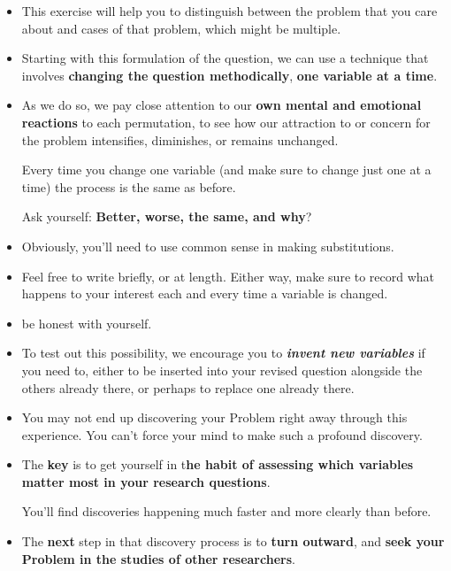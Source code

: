 \documentclass[11pt]{article}
\begin{document}
\begin{itemize}
\begin{exercise}
\begin{itemize}
\item This exercise will help you to distinguish between the problem that you care about and cases of that problem, which might be multiple. 

\item Starting with this formulation of the question, we can use a technique that involves \textbf{changing the question methodically}, \textbf{one variable at a time}. 

\item As we do so, we pay close attention to our \textbf{own mental and emotional reactions} to each permutation, to see how our attraction to or concern for the problem intensifies, diminishes, or remains unchanged.

Every time you change one variable (and make sure to change just one at a time) the process is the same as before. 

Ask yourself: \textbf{Better, worse, the same, and why}?

\item Obviously, you’ll need to use common sense in making substitutions.

\item Feel free to write briefly, or at length. Either way, make sure to record what happens to your interest each and every time a variable is changed.

\item be honest with yourself.

\item To test out this possibility, we encourage you to \emph{\textbf{invent new variables}} if you need to, either to be inserted into your revised question alongside the others already there, or perhaps to replace one already there. 

\item You may not end up discovering your Problem right away through this experience. You can’t force your mind to make such a profound discovery.

\item The \textbf{key} is to get yourself in t\textbf{he habit of assessing which variables matter most in your research questions}. 

You’ll find discoveries happening much faster and more clearly than before.

\item The \textbf{next} step in that discovery process is to \textbf{turn outward}, and \textbf{seek your Problem in the studies of other researchers}. 


\end{itemize}
\end{exercise}
\end{itemize}
\end{document}

